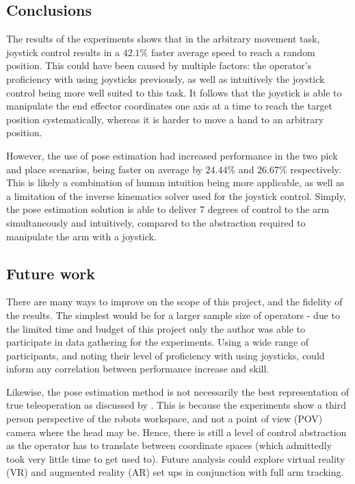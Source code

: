   \subsection{Conclusions}
	
  The results of the experiments shows that in the arbitrary movement task, joystick control results in a \(42.1 \%\) faster average speed to reach a random position.
  This could have been caused by multiple factors: the operator's proficiency with using joysticks previously, as well as intuitively the joystick control being more well suited to this task.
  It follows that the joystick is able to manipulate the end effector coordinates one axis at a time to reach the target position systematically, whereas it is harder to move a hand to an arbitrary position.
  
  However, the use of pose estimation had increased performance in the two pick and place scenarios, being faster on average by \(24.44 \%\) and \(26.67 \%\) respectively.
  This is likely a combination of human intuition being more applicable, as well as a limitation of the inverse kinematics solver used for the joystick control.
  Simply, the pose estimation solution is able to deliver 7 degrees of control to the arm simultaneously and intuitively, compared to the abstraction required to manipulate the arm with a joystick.

	\subsection{Future work}

  There are many ways to improve on the scope of this project, and the fidelity of the results.
  The simplest would be for a larger sample size of operators - due to the limited time and budget of this project only the author was able to participate in data gathering for the experiments.
  Using a wide range of participants, and noting their level of proficiency with using joysticks, could inform any correlation between performance increase and skill.
  
  Likewise, the pose estimation method is not necessarily the best representation of true teleoperation as discussed by \citeauthor{ref:vranalysis} \cite{ref:vranalysis}.
  This is because the experiments show a third person perspective of the robots workspace, and not a point of view (POV) camera where the head may be.
  Hence, there is still a level of control abstraction as the operator has to translate between coordinate spaces (which admittedly took very little time to get used to).
  Future analysis could explore virtual reality (VR) and augmented reality (AR) set ups in conjunction with full arm tracking.
  
